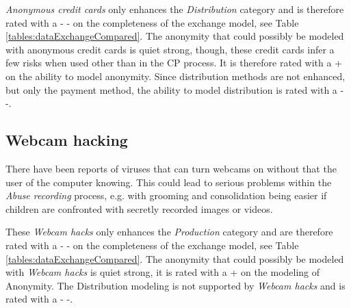 \documentclass{sig-alternate-br}
\begin{document}
\textit{Anonymous credit cards} only enhances the \textit{Distribution} category and is therefore rated with a - - on the completeness of the exchange model, see Table \ref{tables:dataExchangeCompared}. The anonymity that could possibly be modeled with anonymous credit cards is quiet strong, though, these credit cards infer a few risks when used other than in the CP process. It is therefore rated with a + on the ability to model anonymity. Since distribution methods are not enhanced, but only the payment method, the ability to model distribution is rated with a - -.

\subsection{Webcam hacking}
There have been reports \cite{mishna2009ongoing,salomon2010examples} of viruses that can turn webcams on without that the user of the computer knowing. This could lead to serious problems within the \textit{Abuse recording} process, e.g. with grooming and consolidation being easier if children are confronted with secretly recorded images or videos. 

These \textit{Webcam hacks} only enhances the \textit{Production} category and are therefore rated with a - - on the completeness of the exchange model, see Table \ref{tables:dataExchangeCompared}. The anonymity that could possibly be modeled with \textit{Webcam hacks} is quiet strong, it is rated with a + on the modeling of Anonymity. The Distribution modeling is not supported by \textit{Webcam hacks} and is rated with a - -.
\end{document}
